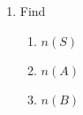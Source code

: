 \begin{exercises}{}
{\begin{enumerate}[itemsep=5pt, label=\textbf{\arabic*}. ]
\begin{enumerate}[noitemsep, label=\textbf{(\alph*)} ]
    \item Find
      \begin{enumerate}[noitemsep, label=\textbf{\roman*.} ]
      \item $n\left(S\right)$
      \item $n\left(A\right)$
      \item $n\left(B\right)$
      \end{enumerate}
    \end{enumerate}
  \end{enumerate}
}
\end{exercises}


